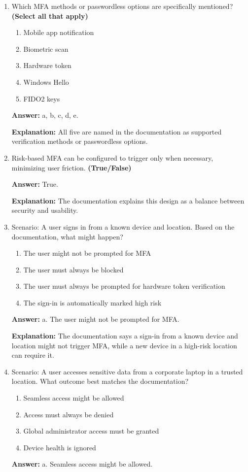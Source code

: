 \documentclass[10pt]{article}
\begin{document}
\begin{enumerate}[leftmargin=*]
\textbf{Answer:} True.

\textbf{Explanation:} The documentation describes a second factor such as a mobile app notification, biometric scan, or hardware token.

\item Which MFA methods or passwordless options are specifically mentioned? \textbf{(Select all that apply)}
\begin{enumerate}[label=\alph*., leftmargin=1.5em]
\item Mobile app notification
\item Biometric scan
\item Hardware token
\item Windows Hello
\item FIDO2 keys
\end{enumerate}
\textbf{Answer:} a, b, c, d, e.

\textbf{Explanation:} All five are named in the documentation as supported verification methods or passwordless options.

\item Risk-based MFA can be configured to trigger only when necessary, minimizing user friction. \textbf{(True/False)}

\textbf{Answer:} True.

\textbf{Explanation:} The documentation explains this design as a balance between security and usability.

\item Scenario: A user signs in from a known device and location. Based on the documentation, what might happen?
\begin{enumerate}[label=\alph*., leftmargin=1.5em]
\item The user might not be prompted for MFA
\item The user must always be blocked
\item The user must always be prompted for hardware token verification
\item The sign-in is automatically marked high risk
\end{enumerate}
\textbf{Answer:} a. The user might not be prompted for MFA.

\textbf{Explanation:} The documentation says a sign-in from a known device and location might not trigger MFA, while a new device in a high-risk location can require it.

\item Scenario: A user accesses sensitive data from a corporate laptop in a trusted location. What outcome best matches the documentation?
\begin{enumerate}[label=\alph*., leftmargin=1.5em]
\item Seamless access might be allowed
\item Access must always be denied
\item Global administrator access must be granted
\item Device health is ignored
\end{enumerate}
\textbf{Answer:} a. Seamless access might be allowed.


\end{enumerate}
\end{document}
